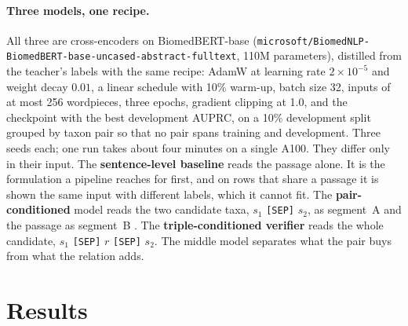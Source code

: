 \documentclass[11pt]{article}
\begin{document}
\paragraph{Three models, one recipe.}
All three are cross-encoders on BiomedBERT-base \citep{gu2021domain}
(\texttt{microsoft/\allowbreak BiomedNLP-\allowbreak BiomedBERT-\allowbreak base-\allowbreak uncased-\allowbreak abstract-\allowbreak fulltext}, 110M parameters), distilled
from the teacher's labels
\citep{bucilua2006model,hinton2015distilling,west2022symbolic,gekhman2023trueteacher} with the same recipe:
AdamW at learning rate $2\times10^{-5}$ and weight decay $0.01$, a linear schedule with 10\% warm-up,
batch size 32, inputs of at most 256 wordpieces, three epochs, gradient clipping at 1.0, and the
checkpoint with the best development AUPRC, on a 10\% development split grouped by taxon pair so
that no pair spans training and development. Three seeds each; one run takes about four minutes on a
single A100. They differ only in their input.
The \textbf{sentence-level baseline} reads the passage alone. It is the formulation a pipeline
reaches for first, and on rows that share a passage it is shown the same input with different
labels, which it cannot fit. The \textbf{pair-conditioned} model reads the two candidate taxa,
$s_1$ \texttt{[SEP]} $s_2$, as segment~A and the passage as segment~B
\citep{nogueira2019passage}. The \textbf{triple-conditioned verifier} reads the whole candidate,
$s_1$ \texttt{[SEP]} $r$ \texttt{[SEP]} $s_2$. The middle model separates what the pair buys from
what the relation adds.

\section{Results}
\label{sec:results}
\end{document}
